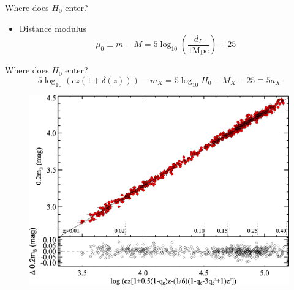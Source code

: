 \documentclass{beamer}
\newcommand{\SNe}{\mathrm{SNe\,Ia}}
\begin{document}
\begin{frame}{Where does $H_0$ enter?}
\begin{itemize}
\item[] Distance modulus
\begin{equation*}
\mu_0 \equiv m - M = 5 \log_{10} \left(\frac{d_L}{1 \mathrm{Mpc}} \right) + 25 \,  \label{Eq:distance-modulus}
\end{equation*}%
\end{itemize}
\end{frame}


\begin{frame}{Where does $H_0$ enter?}
\begin{equation*}\label{Eq:av-definition}
5 \log_{10} ( c z ( 1+\delta(z) )) - m_X = 5 \log_{10} H_0 - M_X - 25 \equiv 5 a_X 
\end{equation*}
\begin{figure}[hbtp]
\centering
\includegraphics[scale=0.8]{../figures/chapter-h0/Hubble-diagram.jpg}
\end{figure}


\end{frame}
\end{document}
